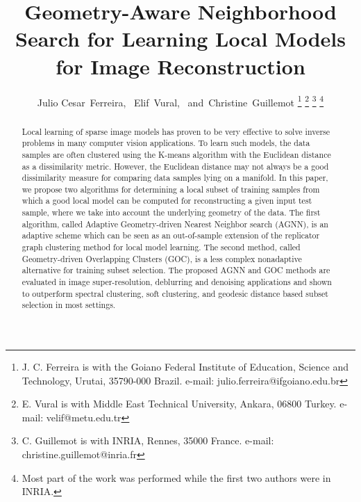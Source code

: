 \documentclass[journal]{IEEEtran}
\begin{document}
\title{Geometry-Aware Neighborhood Search for Learning Local Models for Image Reconstruction}

\author{Julio Cesar~Ferreira,~%
        Elif~Vural,~%
        and~Christine~Guillemot%
\thanks{J. C. Ferreira is with the Goiano Federal Institute of Education, Science and Technology, Urutai, 35790-000 Brazil. e-mail: julio.ferreira@ifgoiano.edu.br}%
\thanks{E. Vural is with Middle East Technical University, Ankara, 06800 Turkey. e-mail: velif@metu.edu.tr}
\thanks{C. Guillemot is with INRIA, Rennes, 35000 France. e-mail:  christine.guillemot@inria.fr}
\thanks{Most part of the work was performed while the first two authors were in INRIA.}}








\maketitle

\begin{abstract}
Local learning of sparse image models has proven to be very effective to solve inverse problems in many computer vision applications.  To learn such models, the data samples are often clustered using the K-means algorithm with the Euclidean distance as a dissimilarity metric.  However, the Euclidean distance may not always be a good dissimilarity measure for comparing data samples lying on a manifold. In this paper, we propose two algorithms for  determining a local subset of training samples from which a good local model can be computed for reconstructing a given input test sample, where we take into account the underlying geometry of the data. The first algorithm, called Adaptive Geometry-driven Nearest Neighbor search (AGNN), is an adaptive scheme which can be seen as an out-of-sample extension of the replicator graph clustering method for local model learning. The second method, called Geometry-driven Overlapping Clusters (GOC), is a less complex nonadaptive alternative for training subset selection. The proposed AGNN and GOC methods are evaluated in image super-resolution, deblurring and denoising applications and shown to outperform  spectral clustering, soft clustering, and geodesic distance based subset selection in most settings.
\end{abstract}
\end{document}
